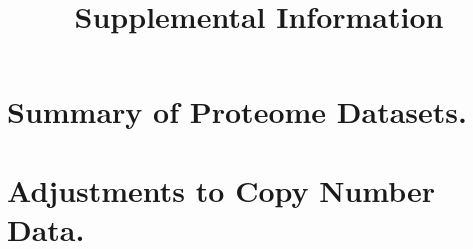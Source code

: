 \documentclass[11pt]{article}
\begin{document}
\title{Supplemental Information}
\maketitle

\section{Summary of Proteome Datasets.}

\section{Adjustments to Copy Number Data.}

%
\end{document}
